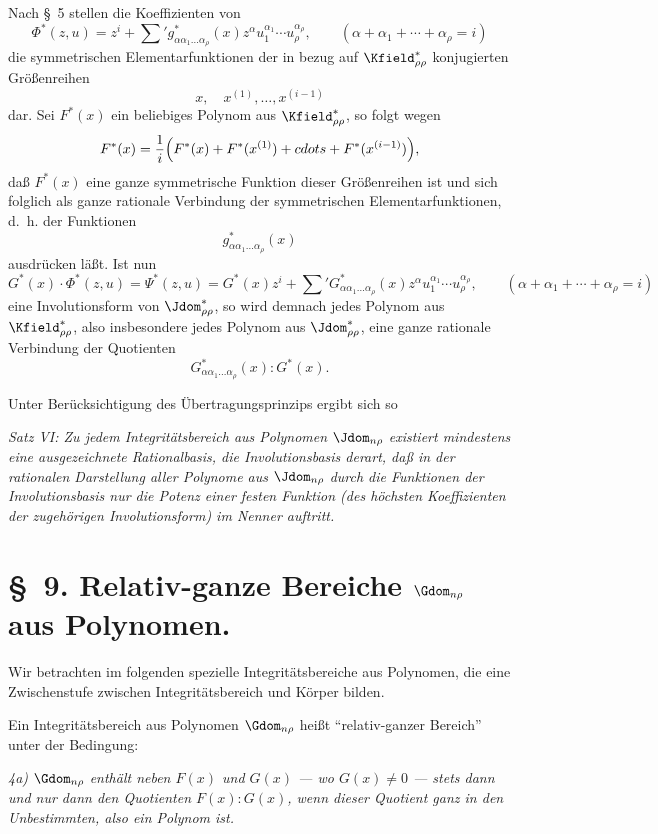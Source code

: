 \documentclass[11pt]{article}
\begin{document}
Nach \S\ 5 stellen die Koeffizienten von
\[
  \Phi^*(z,u)=z^i+\sum{}' g^*_{\alpha\alpha_1\ldots\alpha_\rho}(x)
  z^\alpha u_1^{\alpha_1}\cdots u_\rho^{\alpha_\rho},
  \qquad
  (\alpha+\alpha_1+\cdots+\alpha_\rho=i)
\]
die symmetrischen Elementarfunktionen der in bezug auf $\Kfield^*_{\rho\rho}$ konjugierten Größenreihen
\[
  x,\quad x^{(1)},\ldots,x^{(i-1)}
\]
dar. Sei $F^*(x)$ ein beliebiges Polynom aus $\Kfield^*_{\rho\rho}$, so folgt wegen
\[
  F^*(x)=\frac1i\Bigl(F^*(x)+F^*(x^{(1)})+\\cdots+F^*(x^{(i-1)})\Bigr),
\]
daß $F^*(x)$ eine ganze symmetrische Funktion dieser Größenreihen ist und sich folglich als ganze rationale Verbindung der symmetrischen Elementarfunktionen, d.~h. der Funktionen
\[
  g^*_{\alpha\alpha_1\ldots\alpha_\rho}(x)
\]
ausdrücken läßt. Ist nun
\[
  G^*(x)\cdot\Phi^*(z,u)=\Psi^*(z,u)
  =G^*(x)z^i+
  \sum{}'G^*_{\alpha\alpha_1\ldots\alpha_\rho}(x)
  z^\alpha u_1^{\alpha_1}\cdots u_\rho^{\alpha_\rho},
  \qquad
  (\alpha+\alpha_1+\cdots+\alpha_\rho=i)
\]
eine Involutionsform von $\Jdom^*_{\rho\rho}$, so wird demnach jedes Polynom aus $\Kfield^*_{\rho\rho}$, also insbesondere jedes Polynom aus $\Jdom^*_{\rho\rho}$, eine ganze rationale Verbindung der Quotienten
\[
  G^*_{\alpha\alpha_1\ldots\alpha_\rho}(x):G^*(x).
\]

Unter Berücksichtigung des Übertragungsprinzips ergibt sich so

\emph{Satz VI: Zu jedem Integritätsbereich aus Polynomen $\Jdom_{n\rho}$ existiert mindestens eine ausgezeichnete Rationalbasis, die Involutionsbasis derart, daß in der rationalen Darstellung aller Polynome aus $\Jdom_{n\rho}$ durch die Funktionen der Involutionsbasis nur die Potenz einer festen Funktion (des höchsten Koeffizienten der zugehörigen Involutionsform) im Nenner auftritt.}

\section*{\S\ 9. Relativ-ganze Bereiche $\Gdom_{n\rho}$ aus Polynomen.}

Wir betrachten im folgenden spezielle Integritätsbereiche aus Polynomen, die eine Zwischenstufe zwischen Integritätsbereich und Körper bilden.

Ein Integritätsbereich aus Polynomen $\Gdom_{n\rho}$ heißt ``relativ-ganzer Bereich'' unter der Bedingung:

\emph{4a) $\Gdom_{n\rho}$ enthält neben $F(x)$ und $G(x)$ --- wo $G(x)\ne0$ --- stets dann und nur dann den Quotienten $F(x):G(x)$, wenn dieser Quotient ganz in den Unbestimmten, also ein Polynom ist.}
\end{document}
